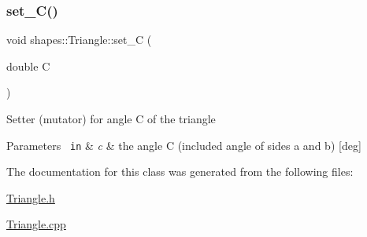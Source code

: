 \subsubsection{\texorpdfstring{set\_C()}{set\_C()}}
{\footnotesize\ttfamily void shapes\+::\+Triangle\+::set\+\_\+C (\begin{DoxyParamCaption}\item[{double}]{C }\end{DoxyParamCaption})}

Setter (mutator) for angle C of the triangle


\begin{DoxyParams}[1]{Parameters}
\mbox{\texttt{ in}}  & {\em c} & the angle C (included angle of sides a and b) \mbox{[}deg\mbox{]} \\
\hline
\end{DoxyParams}


The documentation for this class was generated from the following files\+:\begin{DoxyCompactItemize}
\item 
\mbox{\hyperlink{Triangle_8h}{Triangle.\+h}}\item 
\mbox{\hyperlink{Triangle_8cpp}{Triangle.\+cpp}}\end{DoxyCompactItemize}
